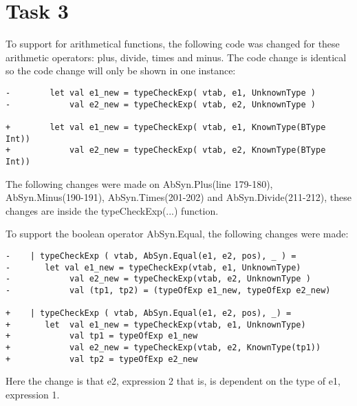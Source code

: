 \section{Task 3}
To support for arithmetical functions, the following code was changed for these
arithmetic operators: plus, divide, times and minus. The code change is
identical so the code change will only be shown in one instance:
\begin{verbatim}
-        let val e1_new = typeCheckExp( vtab, e1, UnknownType )
-            val e2_new = typeCheckExp( vtab, e2, UnknownType )

+        let val e1_new = typeCheckExp( vtab, e1, KnownType(BType Int))
+            val e2_new = typeCheckExp( vtab, e2, KnownType(BType Int))
\end{verbatim}

The following changes were made on AbSyn.Plus(line 179-180), AbSyn.Minus(190-191),
AbSyn.Times(201-202) and AbSyn.Divide(211-212), these changes are inside the
typeCheckExp(...) function.

To support the boolean operator AbSyn.Equal, the following changes were made:
\begin{verbatim}
-    | typeCheckExp ( vtab, AbSyn.Equal(e1, e2, pos), _ ) =
-       let val e1_new = typeCheckExp(vtab, e1, UnknownType)
-            val e2_new = typeCheckExp(vtab, e2, UnknownType )
-            val (tp1, tp2) = (typeOfExp e1_new, typeOfExp e2_new)

+    | typeCheckExp ( vtab, AbSyn.Equal(e1, e2, pos), _) =
+       let  val e1_new = typeCheckExp(vtab, e1, UnknownType)
+            val tp1 = typeOfExp e1_new
+            val e2_new = typeCheckExp(vtab, e2, KnownType(tp1))
+            val tp2 = typeOfExp e2_new 
\end{verbatim}

Here the change is that e2, expression 2 that is, is dependent on the type of
e1, expression 1.\\
\\

